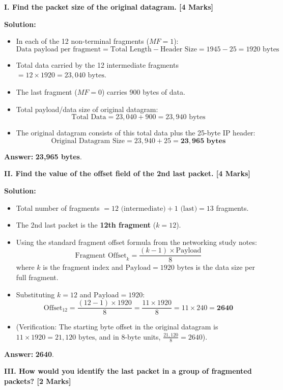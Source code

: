 \documentclass[11pt,a4paper]{article}
\begin{document}
\textbf{I. Find the packet size of the original datagram. [4 Marks]}

\textbf{Solution:}
\begin{itemize}
    \item In each of the 12 non-terminal fragments ($MF = 1$):
    \[
    \text{Data payload per fragment} = \text{Total Length} - \text{Header Size} = 1945 - 25 = 1920\text{ bytes}
    \]
    \item Total data carried by the 12 intermediate fragments $= 12 \times 1920 = 23,040\text{ bytes}$.
    \item The last fragment ($MF = 0$) carries 900 bytes of data.
    \item Total payload/data size of original datagram:
    \[
    \text{Total Data} = 23,040 + 900 = 23,940\text{ bytes}
    \]
    \item The original datagram consists of this total data plus the 25-byte IP header:
    \[
    \text{Original Datagram Size} = 23,940 + 25 = \mathbf{23,965\text{ bytes}}
    \]
\end{itemize}
\textbf{Answer:} \textbf{23,965 bytes}.

\vspace{0.2cm}
\textbf{II. Find the value of the offset field of the 2nd last packet. [4 Marks]}

\textbf{Solution:}
\begin{itemize}
    \item Total number of fragments $= 12 \text{ (intermediate)} + 1 \text{ (last)} = 13$ fragments.
    \item The 2nd last packet is the \textbf{12th fragment} ($k = 12$).
    \item Using the standard fragment offset formula from the networking study notes:
    \[
    \text{Fragment Offset}_k = \frac{(k - 1) \times \text{Payload}}{8}
    \]
    where $k$ is the fragment index and $\text{Payload} = 1920\text{ bytes}$ is the data size per full fragment.
    \item Substituting $k = 12$ and $\text{Payload} = 1920$:
    \[
    \text{Offset}_{12} = \frac{(12 - 1) \times 1920}{8} = \frac{11 \times 1920}{8} = 11 \times 240 = \mathbf{2640}
    \]
    \item (Verification: The starting byte offset in the original datagram is $11 \times 1920 = 21,120\text{ bytes}$, and in 8-byte units, $\frac{21,120}{8} = 2640$).
\end{itemize}
\textbf{Answer:} \textbf{2640}.

\vspace{0.2cm}
\textbf{III. How would you identify the last packet in a group of fragmented packets? [2 Marks]}
\end{document}
